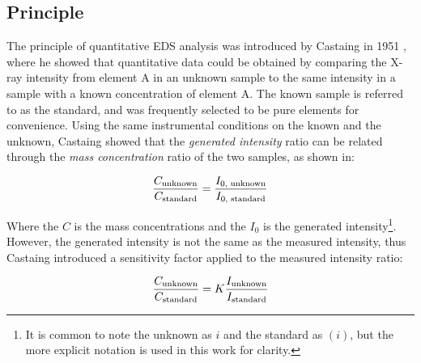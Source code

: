\subsection{Principle}
\label{theory:quantitative:principle}

The principle of quantitative EDS analysis was introduced by Castaing in 1951 \cite{castaing_1951}, where he showed that quantitative data could be obtained by comparing the X-ray intensity from element A in an unknown sample to the same intensity in a sample with a known concentration of element A.
The known sample is referred to as the standard, and was frequently selected to be pure elements for convenience.
Using the same instrumental conditions on the known and the unknown, Castaing showed that the \emph{generated intensity} ratio can be related through the \emph{mass concentration} ratio of the two samples, as shown in:

\begin{equation}
    \label{eq:theory:quantitative:castaing_generated}
    \frac{C_\textnormal{unknown}}{C_\textnormal{standard}} = \frac{I_{0\textnormal{, unknown}}}{I_{0\textnormal{, standard}}}
\end{equation}

Where the $C$ is the mass concentrations and the $I_0$ is the generated intensity\footnote{It is common to note the unknown as $i$ and the standard as $(i)$, but the more explicit notation is used in this work for clarity.}.
However, the generated intensity is not the same as the measured intensity, thus Castaing introduced a sensitivity factor applied to the measured intensity ratio:

\begin{equation}
    \label{eq:theory:quantitative:castaing_measured}
    \frac{C_\textnormal{unknown}}{C_\textnormal{standard}} = K \frac{I_\textnormal{unknown}}{I_\textnormal{standard}}
\end{equation}


